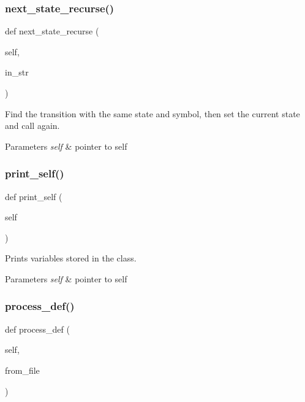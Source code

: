 \subsubsection{\texorpdfstring{next\+\_\+state\+\_\+recurse()}{next\_state\_recurse()}}
{\footnotesize\ttfamily def next\+\_\+state\+\_\+recurse (\begin{DoxyParamCaption}\item[{}]{self,  }\item[{}]{in\+\_\+str }\end{DoxyParamCaption})}



Find the transition with the same state and symbol, then set the current state and call again. 


\begin{DoxyParams}{Parameters}
{\em self} & pointer to self \\
\hline
\end{DoxyParams}
\mbox{\label{classfinite__automaton_1_1_f_a_a7b8ba69ad507d4215937f17424a169b5}} 
\subsubsection{\texorpdfstring{print\+\_\+self()}{print\_self()}}
{\footnotesize\ttfamily def print\+\_\+self (\begin{DoxyParamCaption}\item[{}]{self }\end{DoxyParamCaption})}



Prints variables stored in the class. 


\begin{DoxyParams}{Parameters}
{\em self} & pointer to self \\
\hline
\end{DoxyParams}
\mbox{\label{classfinite__automaton_1_1_f_a_a69da294e9158ca41fff39c1c3152b96f}} 
\subsubsection{\texorpdfstring{process\+\_\+def()}{process\_def()}}
{\footnotesize\ttfamily def process\+\_\+def (\begin{DoxyParamCaption}\item[{}]{self,  }\item[{}]{from\+\_\+file }\end{DoxyParamCaption})}




